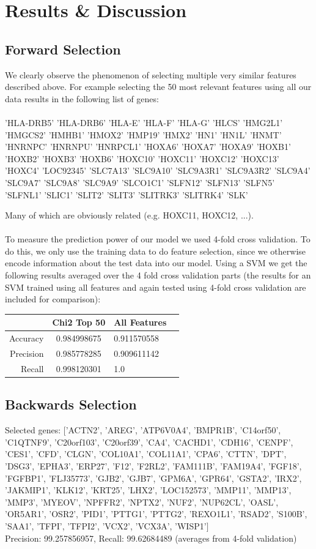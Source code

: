 \documentclass[10.75pt]{article}
\begin{document}
\section{Results \& Discussion}

\subsection{Forward Selection}
We clearly observe the phenomenon of selecting multiple very similar features described above. For example selecting the 50 most relevant features using all our data results in the following list of genes:\\\\
'HLA-DRB5' 'HLA-DRB6' 'HLA-E' 'HLA-F' 'HLA-G' 'HLCS' 'HMG2L1' 'HMGCS2'
 'HMHB1' 'HMOX2' 'HMP19' 'HMX2' 'HN1' 'HN1L' 'HNMT' 'HNRNPC' 'HNRNPU'
 'HNRPCL1' 'HOXA6' 'HOXA7' 'HOXA9' 'HOXB1' 'HOXB2' 'HOXB3' 'HOXB6' 'HOXC10'
 'HOXC11' 'HOXC12' 'HOXC13' 'HOXC4' 'LOC92345' 'SLC7A13' 'SLC9A10'
 'SLC9A3R1' 'SLC9A3R2' 'SLC9A4' 'SLC9A7' 'SLC9A8' 'SLC9A9' 'SLCO1C1'
 'SLFN12' 'SLFN13' 'SLFN5' 'SLFNL1' 'SLIC1' 'SLIT2' 'SLIT3' 'SLITRK3'
 'SLITRK4' 'SLK'
 
Many of which are obviously related (e.g. HOXC11, HOXC12, ...).\\\\
To measure the prediction power of our model we used 4-fold cross validation. To do this, we only use the training data to do feature selection, since we otherwise encode information about the test data into our model. Using a SVM we get the following results averaged over the 4 fold cross validation parts (the results for an SVM trained using all features and again tested using 4-fold cross validation are included for comparison):\\

\begin{tabular}{r | c l c }
    & Chi2 Top 50 & All Features\\
  \hline 
    Accuracy & 0.984998675 & 0.911570558 \\
    Precision & 0.985778285 & 0.909611142 \\
    Recall & 0.998120301 & 1.0 \\
  
\end{tabular}
\subsection{Backwards Selection}

Selected genes: $[$'ACTN2', 'AREG', 'ATP6V0A4', 'BMPR1B', 'C14orf50', 'C1QTNF9', 'C20orf103', 'C20orf39', 'CA4', 'CACHD1', 'CDH16', 'CENPF', 'CES1', 'CFD', 'CLGN', 'COL10A1', 'COL11A1', 'CPA6', 'CTTN', 'DPT', 'DSG3', 'EPHA3', 'ERP27', 'F12', 'F2RL2', 'FAM111B', 'FAM19A4', 'FGF18', 'FGFBP1', 'FLJ35773', 'GJB2', 'GJB7', 'GPM6A', 'GPR64', 'GSTA2', 'IRX2', 'JAKMIP1', 'KLK12', 'KRT25', 'LHX2', 'LOC152573', 'MMP11', 'MMP13', 'MMP3', 'MYEOV', 'NPFFR2', 'NPTX2', 'NUF2', 'NUP62CL', 'OASL', 'OR5AR1', 'OSR2', 'PID1', 'PTTG1', 'PTTG2', 'REXO1L1', 'RSAD2', 'S100B', 'SAA1', 'TFPI', 'TFPI2', 'VCX2', 'VCX3A', 'WISP1'$]$\\
Precision: 99.257856957, Recall: 99.62684489 (averages from 4-fold validation)
\end{document}

